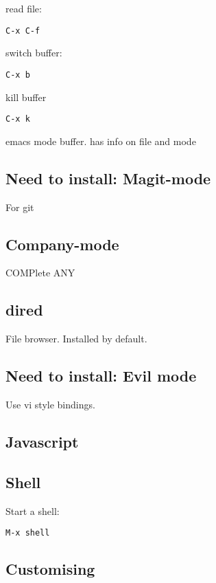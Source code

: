 read file:
\begin{verbatim}
C-x C-f
\end{verbatim}


switch buffer:
\begin{verbatim}
C-x b
\end{verbatim}

kill buffer
\begin{verbatim}
C-x k
\end{verbatim}

emacs mode buffer. has info on file and mode



\subsection{Need to install: Magit-mode}

For git

\subsection{Company-mode}
COMPlete ANY

\subsection{dired}
File browser. Installed by default.

\subsection{Need to install: Evil mode}

Use vi style bindings.

\subsection{Javascript}

\subsection{Shell}

Start a shell:

\begin{verbatim}
M-x shell
\end{verbatim}

\subsection{Customising}


